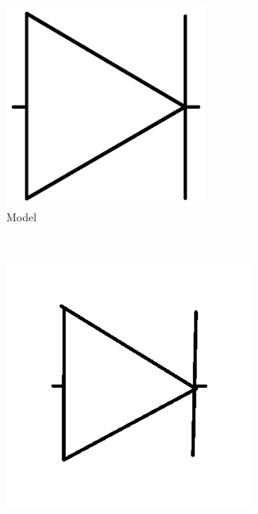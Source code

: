     \begin{figure}[h]
        \centering
                \begin{subfigure}[b]{0.2\textwidth}
                \centering
                \includegraphics[width=0.73\textwidth]{figures/Results/Sketches50f/Model.png}
                \caption{Model}
        \end{subfigure}\\
                \begin{subfigure}[b]{0.25\textwidth}
                \centering
                \includegraphics[width=0.9\textwidth]{figures/Results/Sketches50f/level1.png}

\end{subfigure}
\end{figure}

